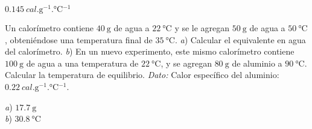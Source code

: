 \begin{Answer}
  $\SI{0.145}{cal.\gram^{-1}.\celsius^{-1}}$
\end{Answer}
%
\begin{Exercise}
  Un calorímetro contiene $\SI{40}{\gram}$ de agua a $\SI{22}{\celsius}$ y se le agregan $\SI{50}{\gram}$ de agua a $\SI{50}{\celsius}$, obteniéndose una temperatura final de $\SI{35}{\celsius}$. \textit{a}) Calcular el equivalente en agua del calorímetro. \textit{b}) En un nuevo experimento, este mismo calorímetro contiene $\SI{100}{\gram}$ de agua a una temperatura de $\SI{22}{\celsius}$, y se agregan $\SI{80}{\gram}$ de aluminio a $\SI{90}{\celsius}$. Calcular la temperatura de equilibrio. \textit{Dato:} Calor específico del aluminio: $\SI{0.22}{cal.\gram^{-1}.\celsius^{-1}}$.
\end{Exercise}
\begin{Answer}
	\begin{minipage}[t]{.4\textwidth}
    \textit{a}) $\SI{17.7}{\gram}$\\ \textit{b}) $\SI{30.8}{\celsius}$
  \end{minipage}
\end{Answer}
%

